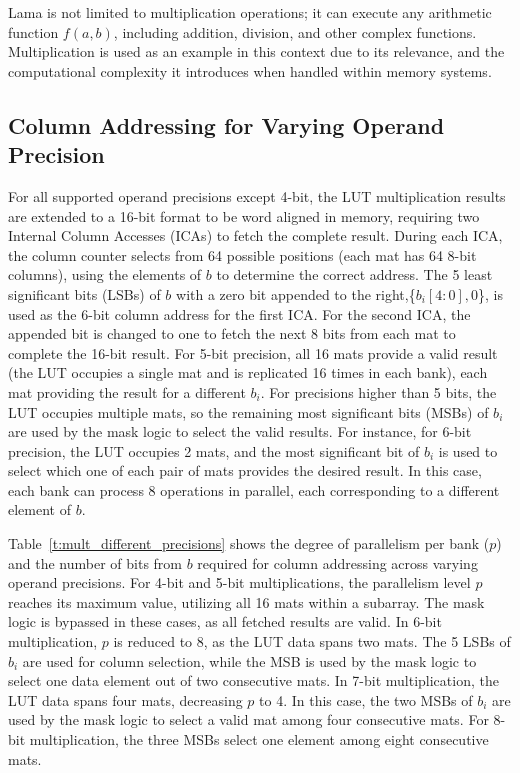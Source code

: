 
Lama is not limited to multiplication operations; it can execute any arithmetic function $f(a,b)$, including addition, division, and other complex functions. Multiplication is used as an example in this context due to its relevance, and the computational complexity it introduces when handled within memory systems.

\subsection{Column Addressing for Varying Operand Precision}
For all supported operand precisions except 4-bit, the LUT multiplication results are extended to a 16-bit format to be word aligned in memory, requiring two Internal Column Accesses (ICAs) to fetch the complete result. During each ICA, the column counter selects from 64 possible positions (each mat has 64 8-bit columns), using the elements of $b$ to determine the correct address. The 5 least significant bits (LSBs) of $b$ with a zero bit appended to the right,\{$b_{i}[4:0], 0$\}, is used as the 6-bit column address for the first ICA. For the second ICA, the appended bit is changed to one to fetch the next 8 bits from each mat to complete the 16-bit result. For 5-bit precision, all 16 mats provide a valid result (the LUT occupies a single mat and is replicated 16 times in each bank), each mat providing the result for a different $b_{i}$. For precisions higher than 5 bits, the LUT occupies multiple mats, so the remaining most significant bits (MSBs) of $b_{i}$ are used by the mask logic to select the valid results. For instance, for 6-bit precision, the LUT occupies 2 mats, and the most significant bit of $b_{i}$ is used to select which one of each pair of mats provides the desired result. In this case, each bank can process 8 operations in parallel, each corresponding to a different element of $b$.

Table~\ref{t:mult_different_precisions} shows the degree of parallelism per bank ($p$) and the number of bits from $b$ required for column addressing across varying operand precisions. For 4-bit and 5-bit multiplications, the parallelism level $p$ reaches its maximum value, utilizing all 16 mats within a subarray. The mask logic is bypassed in these cases, as all fetched results are valid. In 6-bit multiplication, $p$ is reduced to 8, as the LUT data spans two mats. The 5 LSBs of $b_i$ are used for column selection, while the MSB is used by the mask logic to select one data element out of two consecutive mats. In 7-bit multiplication, the LUT data spans four mats, decreasing $p$ to 4. In this case, the two MSBs of $b_i$ are used by the mask logic to select a valid mat among four consecutive mats. For 8-bit multiplication, the three MSBs select one element among eight consecutive mats.

